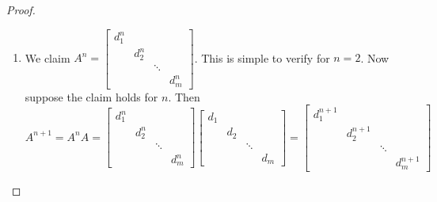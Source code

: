 \begin{exercise}
\begin{proof}
\begin{enumerate}
            \item We claim \( A^n = \begin{bmatrix} d_1^n & & & \\ & d_2^n & & \\ & & \ddots & \\ & & & d_m^n \end{bmatrix} \). This is simple to verify for \( n = 2 \). Now suppose the claim holds for \( n \). Then
            \[
                A^{n+1} = A^n A = \begin{bmatrix} d_1^n & & & \\ & d_2^n & & \\ & & \ddots & \\ & & & d_m^n \end{bmatrix} \begin{bmatrix} d_1 & & & \\ & d_2 & & \\ & & \ddots & \\ & & & d_m \end{bmatrix} = \begin{bmatrix} d_1^{n+1} & & & \\ & d_2^{n+1} & & \\ & & \ddots & \\ & & & d_m^{n+1} \end{bmatrix} 
            \]
        \end{enumerate}
    \end{proof}
\end{exercise} %

\begin{exercise} \label{e1.4.12}
\end{exercise} %

\begin{exercise} \label{e1.4.13}
\end{exercise} %

\begin{exercise} \label{e1.4.14}
\end{exercise} %

\begin{exercise} \label{e1.4.15}
\end{exercise} %

\begin{exercise} \label{e1.4.16}
\end{exercise} %

\begin{exercise} \label{e1.4.17}
\end{exercise} %

